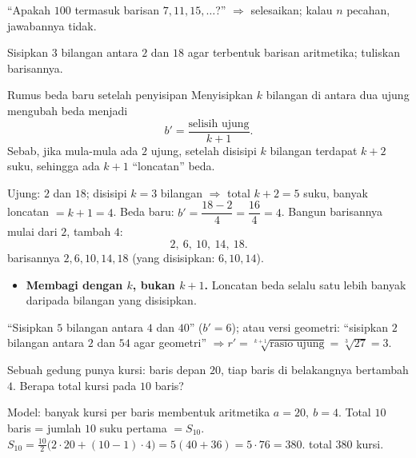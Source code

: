 \begin{variasi}
``Apakah $100$ termasuk barisan $7,11,15,\dots$?'' $\Rightarrow$ selesaikan; kalau
$n$ pecahan, jawabannya tidak.
\end{variasi}

\begin{soalbox}{}
Sisipkan $3$ bilangan antara $2$ dan $18$ agar terbentuk barisan aritmetika;
tuliskan barisannya.
\end{soalbox}

\begin{ingat}{Rumus beda baru setelah penyisipan}
Menyisipkan $k$ bilangan di antara dua ujung mengubah beda menjadi
\[
b' = \frac{\text{selisih ujung}}{k+1}.
\]
Sebab, jika mula-mula ada $2$ ujung, setelah disisipi $k$ bilangan terdapat
$k+2$ suku, sehingga ada $k+1$ ``loncatan'' beda.
\end{ingat}

\jawab
{} Ujung: $2$ dan $18$; disisipi $k=3$ bilangan $\Rightarrow$ total
$k+2=5$ suku, banyak loncatan $=k+1=4$.
 Beda baru: $b'=\dfrac{18-2}{4}=\dfrac{16}{4}=4$.
 Bangun barisannya mulai dari $2$, tambah $4$:
\[
2,\ 6,\ 10,\ 14,\ 18.
\]
\jadi barisannya $2,6,10,14,18$ (yang disisipkan: $6,10,14$).

\begin{jebakan}
\begin{itemize}[leftmargin=*,topsep=2pt]
  \item \textbf{Membagi dengan $k$, bukan $k+1$.} Loncatan beda selalu satu lebih
  banyak daripada bilangan yang disisipkan.
\end{itemize}
\end{jebakan}

\begin{variasi}
``Sisipkan $5$ bilangan antara $4$ dan $40$'' ($b'=6$); atau versi geometri:
``sisipkan $2$ bilangan antara $2$ dan $54$ agar geometri'' $\Rightarrow
r'=\sqrt[k+1]{\text{rasio ujung}}=\sqrt[3]{27}=3$.
\end{variasi}

\begin{soalbox}{}
Sebuah gedung punya kursi: baris depan $20$, tiap baris di belakangnya bertambah
$4$. Berapa total kursi pada $10$ baris?
\end{soalbox}

\jawab
{} Model: banyak kursi per baris membentuk aritmetika $a=20,\ b=4$.
Total $10$ baris = jumlah $10$ suku pertama $=S_{10}$.
 $S_{10}=\frac{10}{2}\big(2\cdot20+(10-1)\cdot4\big)=5(40+36)=5\cdot76=380$.
\jadi total $380$ kursi.

